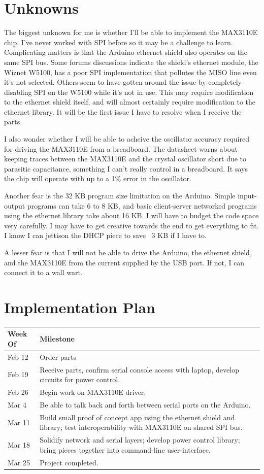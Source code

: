 \documentclass{amsart}
\begin{document}
\section{Unknowns}
The biggest unknown for me is whether I'll be able to implement the MAX3110E chip.  I've never worked with SPI before so it may be a challenge to learn.  Complicating matters is that the Arduino ethernet shield also operates on the same SPI bus.  Some forums discussions indicate the shield's ethernet module, the Wiznet W5100, has a poor SPI implementation that pollutes the MISO line even it's not selected.  Others seem to have gotten around the issue by completely disabling SPI on the W5100 while it's not in use.  This may require modification to the ethernet shield itself, and will almost certainly require modification to the ethernet library.  It will be the first issue I have to resolve when I receive the parts.

I also wonder whether I will be able to acheive the oscillator accuracy required for driving the MAX3110E from a breadboard.  The datasheet warns about keeping traces between the MAX3110E and the crystal oscillator short due to parasitic capacitance, something I can't really control in a breadboard.  It says the chip will operate with up to a 1\% error in the oscillator.

Another fear is the 32 KB program size limitation on the Arduino.  Simple input-output programs can take 6 to 8 KB, and basic client-server networked programs using the ethernet library take about 16 KB.  I will have to budget the code space very carefully.  I may have to get creative towards the end to get everything to fit.  I know I can jettison the DHCP piece to save ~3 KB if I have to.

A lesser fear is that I will not be able to drive the Arduino, the ethernet shield, and the MAX3110E from the current supplied by the USB port.  If not, I can connect it to a wall wart.

\section{Implementation Plan}
\begin{tabular}{lp{4in}}
Week Of & Milestone\\
\hline
Feb 12 & Order parts\\
Feb 19 & Receive parts, confirm serial console access with laptop, develop circuits for power control.\\
Feb 26 & Begin work on MAX3110E driver.\\
Mar 4 & Be able to talk back and forth between serial ports on the Arduino.\\
Mar 11 & Build small proof of concept app using the ethernet shield and library; test interoperability with MAX3110E on shared SPI bus.\\
Mar 18 & Solidify network and serial layers; develop power control library; bring pieces together into command-line user-interface.\\
Mar 25 & Project completed.\\
\end{tabular}
\end{document}
